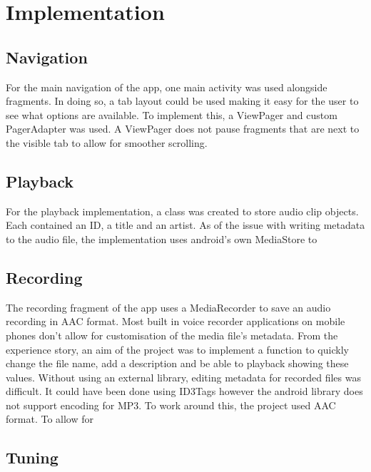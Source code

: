 \documentclass[conference]{acmsiggraph}
\begin{document}
 
\section{Implementation}

\subsection{Navigation}

For the main navigation of the app, one main activity was used alongside fragments. In doing so, a tab layout could be used making it easy for the user to see what options are available. To implement this, a ViewPager and custom PagerAdapter was used. A ViewPager does not pause fragments that are next to the visible tab to allow for smoother scrolling.

\subsection{Playback}

For the playback implementation, a class was created to store audio clip objects. Each contained an ID, a title and an artist. As of the issue with writing metadata to the audio file, the implementation uses android's own MediaStore to  %

\subsection{Recording}

The recording fragment of the app uses a MediaRecorder to save an audio recording in AAC format. Most built in voice recorder applications on mobile phones don't allow for customisation of the media file's metadata. From the experience story, an aim of the project was to implement a function to quickly change the file name, add a description and be able to playback showing these values. Without using an external library, editing metadata for recorded files was difficult. It could have been done using ID3Tags however the android library does not support encoding for MP3. To work around this, the project used AAC format. 
To allow for 



\subsection{Tuning}
\end{document}
